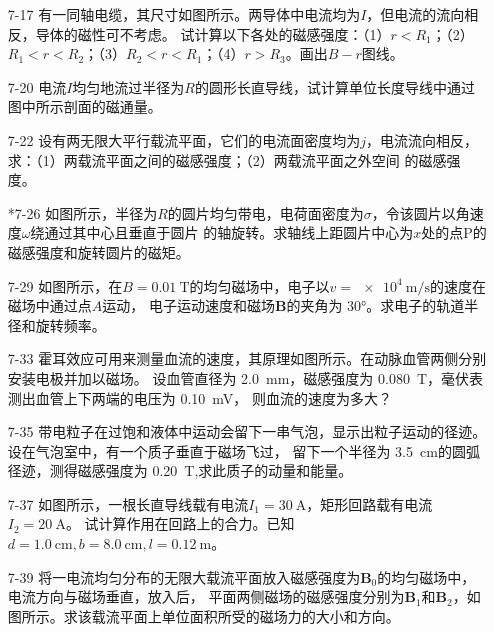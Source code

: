 \documentclass[UTF-8]{ctexart}
\makeatletter
\newcommand{\mlabel}[2]{#2\def\@currentlabel{#2}\label{#1}}
\newcommand{\csi}[2]{ \SI{#1}{#2}}
\makeatother
\begin{document}
\begin{enumerate}
    \item[\mlabel{itm:17}{7-17}] 有一同轴电缆，其尺寸如图所示。两导体中电流均为\(I\)，但电流的流向相反，导体的磁性可不考虑。
        试计算以下各处的磁感强度：（1）\(r<R_1\)；（2）\(R_1<r<R_2\)；（3）\(R_2<r<R_1\)；（4）\(r>R_3\)。画出\(B-r\)图线。
    
    \item[\mlabel{itm:20}{7-20}] 电流\(I\)均匀地流过半径为\(R\)的圆形长直导线，试计算单位长度导线中通过图中所示剖面的磁通量。

    \item[7-22] 设有两无限大平行载流平面，它们的电流面密度均为\(j\)，电流流向相反，求：（1）两载流平面之间的磁感强度；（2）两载流平面之外空间
        的磁感强度。
    
    \item[\mlabel{itm:26}{*7-26}] 如图所示，半径为\(R\)的圆片均匀带电，电荷面密度为\(\sigma\)，令该圆片以角速度\(\omega\)绕通过其中心且垂直于圆片
        的轴旋转。求轴线上距圆片中心为\(x\)处的点P的磁感强度和旋转圆片的磁矩。
    
    \item[\mlabel{itm:29}{7-29}] 如图所示，在\(B=\csi{0.01}{\tesla}\)的均匀磁场中，电子以\(v=\csi{e4}{\m\per\s}\)的速度在磁场中通过点\(A\)运动，
        电子运动速度和磁场\(\bm{B}\)的夹角为 \ang{30}。求电子的轨道半径和旋转频率。
    
    \item[\mlabel{itm:33}{7-33}] 霍耳效应可用来测量血流的速度，其原理如图所示。在动脉血管两侧分别安装电极并加以磁场。
        设血管直径为\csi{2.0}{\mm}，磁感强度为\csi{0.080}{\tesla}，毫伏表测出血管上下两端的电压为\csi{0.10}{\mV}，
        则血流的速度为多大？
    
    \item[7-35] 带电粒子在过饱和液体中运动会留下一串气泡，显示出粒子运动的径迹。设在气泡室中，有一个质子垂直于磁场飞过，
        留下一个半径为\csi{3.5}{\cm}的圆弧径迹，测得磁感强度为\csi{0.20}{\tesla},求此质子的动量和能量。
    
    \item[\mlabel{itm:37}{7-37}] 如图所示，一根长直导线载有电流\(I_1=\csi{30}{\A}\)，矩形回路载有电流\(I_2=\csi{20}{\A}\)。
        试计算作用在回路上的合力。已知\(d=\csi{1.0}{\cm},b=\csi{8.0}{\cm},l=\csi{0.12}{\m}\)。
    
    \item[\mlabel{itm:39}{7-39}] 将一电流均匀分布的无限大载流平面放入磁感强度为\(\bm{B}_0\)的均匀磁场中，电流方向与磁场垂直，放入后，
        平面两侧磁场的磁感强度分别为\(\bm{B}_1\)和\(\bm{B}_2\)，如图所示。求该载流平面上单位面积所受的磁场力的大小和方向。
    

\end{enumerate}
\end{document}
